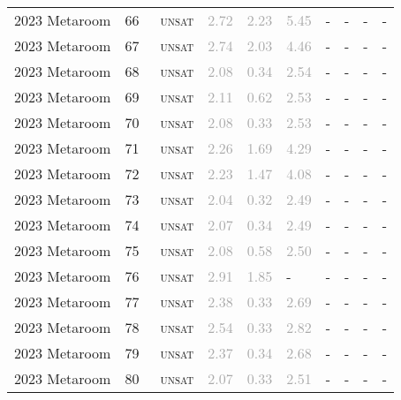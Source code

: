 \begin{center}
{\begin{longtable}{@{}llllllllll@{}}
2023 Metaroom & 66 & ~\textsc{unsat} & \textcolor{darkgray}{2.72} & \textcolor{darkgray}{2.23} & \textcolor{darkgray}{5.45} & - & - & - & - \\
2023 Metaroom & 67 & ~\textsc{unsat} & \textcolor{darkgray}{2.74} & \textcolor{darkgray}{2.03} & \textcolor{darkgray}{4.46} & - & - & - & - \\
2023 Metaroom & 68 & ~\textsc{unsat} & \textcolor{darkgray}{2.08} & \textcolor{darkgray}{0.34} & \textcolor{darkgray}{2.54} & - & - & - & - \\
2023 Metaroom & 69 & ~\textsc{unsat} & \textcolor{darkgray}{2.11} & \textcolor{darkgray}{0.62} & \textcolor{darkgray}{2.53} & - & - & - & - \\
2023 Metaroom & 70 & ~\textsc{unsat} & \textcolor{darkgray}{2.08} & \textcolor{darkgray}{0.33} & \textcolor{darkgray}{2.53} & - & - & - & - \\
2023 Metaroom & 71 & ~\textsc{unsat} & \textcolor{darkgray}{2.26} & \textcolor{darkgray}{1.69} & \textcolor{darkgray}{4.29} & - & - & - & - \\
2023 Metaroom & 72 & ~\textsc{unsat} & \textcolor{darkgray}{2.23} & \textcolor{darkgray}{1.47} & \textcolor{darkgray}{4.08} & - & - & - & - \\
2023 Metaroom & 73 & ~\textsc{unsat} & \textcolor{darkgray}{2.04} & \textcolor{darkgray}{0.32} & \textcolor{darkgray}{2.49} & - & - & - & - \\
2023 Metaroom & 74 & ~\textsc{unsat} & \textcolor{darkgray}{2.07} & \textcolor{darkgray}{0.34} & \textcolor{darkgray}{2.49} & - & - & - & - \\
2023 Metaroom & 75 & ~\textsc{unsat} & \textcolor{darkgray}{2.08} & \textcolor{darkgray}{0.58} & \textcolor{darkgray}{2.50} & - & - & - & - \\
2023 Metaroom & 76 & ~\textsc{unsat} & \textcolor{darkgray}{2.91} & \textcolor{darkgray}{1.85} & - & - & - & - & - \\
2023 Metaroom & 77 & ~\textsc{unsat} & \textcolor{darkgray}{2.38} & \textcolor{darkgray}{0.33} & \textcolor{darkgray}{2.69} & - & - & - & - \\
2023 Metaroom & 78 & ~\textsc{unsat} & \textcolor{darkgray}{2.54} & \textcolor{darkgray}{0.33} & \textcolor{darkgray}{2.82} & - & - & - & - \\
2023 Metaroom & 79 & ~\textsc{unsat} & \textcolor{darkgray}{2.37} & \textcolor{darkgray}{0.34} & \textcolor{darkgray}{2.68} & - & - & - & - \\
2023 Metaroom & 80 & ~\textsc{unsat} & \textcolor{darkgray}{2.07} & \textcolor{darkgray}{0.33} & \textcolor{darkgray}{2.51} & - & - & - & - \\

\end{longtable}}
\end{center}
